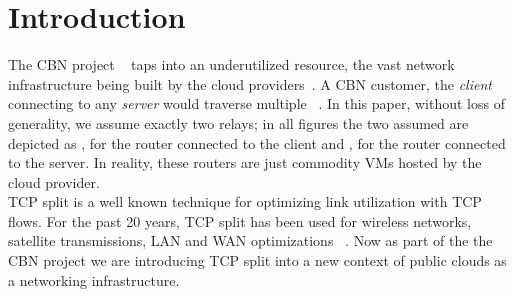 \section{Introduction}
The CBN project ~\cite{Elastic} taps into an underutilized resource, the vast network infrastructure being built by the cloud providers~\cite{aws2018spending, gcp2018spending, microsoft2018spending}. A CBN customer, the \textit{client} connecting to any \textit{server} would traverse multiple \relays ~\cite{CDD}. In this paper, without loss of generality, we assume exactly two relays; in all figures the two assumed \relays are depicted as \rc, for the router connected to the client and \rs, for the router connected to the server. In reality, these routers are just commodity VMs hosted by the cloud provider.\\
TCP split is a well known technique for optimizing link utilization with TCP flows. For the past 20 years, TCP split has been used for wireless networks, satellite transmissions, LAN and WAN optimizations ~\cite{chakravorty2003aggregation, le2015experiences,luglio2004,siracusano2016miniproxy,kernelsplit, Akamai_Radio}. 
Now as part of the the CBN project we are introducing TCP split into a new context of public clouds as a networking infrastructure.